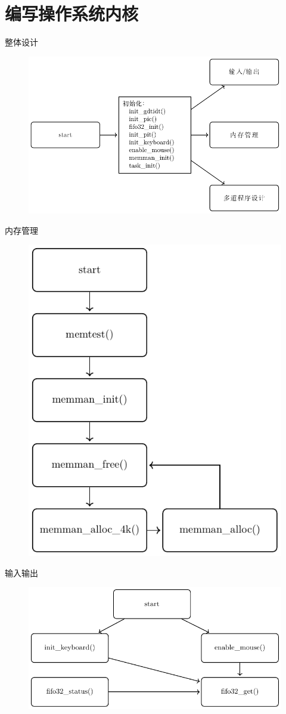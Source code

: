 \documentclass{beamer}
\begin{document}
    \section{编写操作系统内核}
    \begin{frame}{整体设计}
      \begin{figure}[H]
        \centering
        \includegraphics[width=\textwidth]{../Thesis/fig/func/run.pdf}
      \end{figure}
    \end{frame}
    \begin{frame}{内存管理}
      \begin{figure}[H]
        \centering
        \includegraphics[width=.5\textwidth]{../Thesis/fig/func/memman.pdf}
      \end{figure}
    \end{frame}
    \begin{frame}{输入输出}
      \begin{figure}[H]
        \centering
        \includegraphics[width=\textwidth]{../Thesis/fig/func/io.pdf}
      \end{figure}
    \end{frame}
\end{document}
